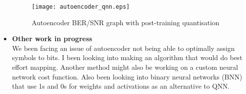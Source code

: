\begin{itemize}
    \begin{figure}[H]
	\centering
	\texttt{[image: autoencoder\_qnn.eps]}
	\caption{Autoencoder BER/SNR graph with post-training quantisation}
	\label{fig:qnn_snr}	
    \end{figure}
    
    \item \textbf{Other work in progress}\\
    We been facing an issue of autoencoder not being able to optimally assign symbols to bits. I been looking into making an algorithm that would do best effort mapping. Another method might also be working on a custom neural network cost function.
    Also been looking into binary neural networks (BNN) that use 1s and 0s for weights and activations as an alternative to QNN.
\end{itemize}



